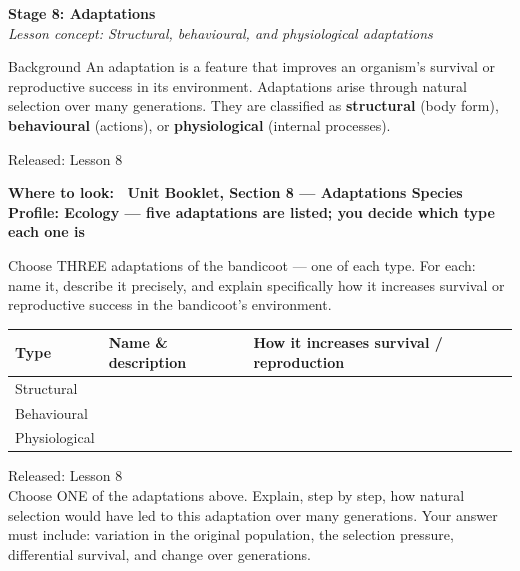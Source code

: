 \documentclass[11pt,a4paper]{article}
\newcommand{\wheretolook}[1]{%
  \par\vspace{2pt}\noindent
  \colorbox{GoldLight}{\parbox{\dimexpr\linewidth-2\fboxsep\relax}{%
    \small\color{GoldDark}\headingfont\bfseries Where to look:\ %
    \normalfont\color{DarkGrey}#1}}\par\vspace{4pt}}
\newcommand{\answerbox}[1]{%
  \begin{tcolorbox}[
    enhanced, breakable, arc=2mm,
    colback=Paper, colframe=Line,
    left=2mm, right=2mm, top=1mm, bottom=1mm,
    boxrule=1pt, height=#1
  ]
  \end{tcolorbox}%
}
\newcommand{\stagediv}[3]{%
  \needspace{6\baselineskip}
  \begin{tcolorbox}[
    enhanced, breakable=false, arc=3.5mm,
    colback=ForestDark, colframe=ForestDark, boxrule=0pt,
    sidebyside, sidebyside align=center,
    lefthand width=2.2cm,
    left=2mm, right=4mm, top=4mm, bottom=4mm
  ]
    \begin{center}
      {\headingfont\bfseries\color{Forest!35!ForestDark}\fontsize{42}{42}\selectfont #1}
    \end{center}
    \tcblower
    {\headingfont\bfseries\color{white}\large Stage #1: #2}\\[3pt]
    {\itshape\color{white!75!ForestDark}\small Lesson concept: #3}
  \end{tcolorbox}%
  \vspace{6pt}%
}
\newcommand{\yr}[2]{\noindent{\headingfont\bfseries\small\color{Forest}%
  \rule[0.2ex]{1.2em}{2pt}\hspace{4pt}#1}\hfill{\small\color{DarkGrey}#2}\\[2pt]}
\newcommand{\yrviii}[2]{\noindent{\headingfont\bfseries\small\color{Violet}%
  \rule[0.2ex]{1.2em}{2pt}\hspace{4pt}#1}\hfill{\small\color{DarkGrey}#2}\\[2pt]}
\begin{document}
\newpage

\stagediv{8}{Adaptations}{Structural, behavioural, and physiological adaptations}

\begin{contextbox}{Background}
An adaptation is a feature that improves an organism's survival or reproductive success in its environment. Adaptations arise through natural selection over many generations. They are classified as \textbf{structural} (body form), \textbf{behavioural} (actions), or \textbf{physiological} (internal processes).
\end{contextbox}

\bigskip

\begin{yr7box}
\yr{At The Level}{Released: Lesson 8}

\wheretolook{Unit Booklet, Section 8 --- Adaptations \textbullet{} \textbf{Species Profile: Ecology} --- five adaptations are listed; you decide which type each one is}
Choose THREE adaptations of the bandicoot --- one of each type. For each: name it, describe it precisely, and explain specifically how it increases survival or reproductive success in the bandicoot's environment.

\medskip
\noindent\begin{tabularx}{\linewidth}{|p{2.4cm}|p{3.8cm}|X|}
  \hline
  \rowcolor{TableHead}
  \headingfont\bfseries\color{white} Type &
  \headingfont\bfseries\color{white} Name \& description &
  \headingfont\bfseries\color{white} How it increases survival / reproduction \\
  \hline
  Structural & & \\[78pt]
  \hline
  \rowcolor{RowAlt}
  Behavioural & & \\[78pt]
  \hline
  Physiological & & \\[78pt]
  \hline
\end{tabularx}
\end{yr7box}

\bigskip
\newpage
\begin{yr8box}
\yrviii{Above The Level}{Released: Lesson 8}
Choose ONE of the adaptations above. Explain, step by step, how natural selection would have led to this adaptation over many generations. Your answer must include: variation in the original population, the selection pressure, differential survival, and change over generations.
\answerbox{21cm}
\end{yr8box}
\end{document}
